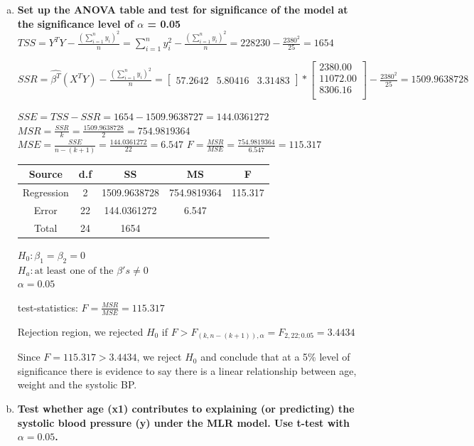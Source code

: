 \documentclass{article}
\begin{document}
\begin{enumerate}[(a)]
\item \textbf{ Set up the ANOVA table and test for significance of the model at the significance level of $\alpha$ = 0.05 } \\
$TSS = Y^TY - \frac{(\sum_{i=1}^{n}{y_i})^2}{n} = \sum_{i=1}^{n}{y_i^2} - \frac{(\sum_{i=1}^{n}{y_i})^2}{n}  = 228230 - \frac{2380^2}{25} = 1654$

$SSR = \hat{\beta^T}(X^TY)  - \frac{(\sum_{i=1}^{n}{y_i})^2}{n}  = \begin{bmatrix}
57.2642 & 5.80416 & 3.31483
\end{bmatrix} * \begin{bmatrix}
2380.00 \\
11072.00 \\
8306.16 \\
\end{bmatrix} - \frac{2380^2}{25} = 1509.9638728$

$SSE = TSS - SSR = 1654 - 1509.9638727 = 144.0361272$
$MSR = \frac{SSR}{k} = \frac{1509.9638728}{2} = 754.9819364$
$MSE = \frac{SSE}{n-(k+1)} = \frac{144.0361272}{22} = 6.547$
$F = \frac{MSR}{MSE} = \frac{754.9819364}{6.547} = 115.317$

\begin{center}
 \begin{tabular}{||c c c c c||} 
 \hline
Source & d.f & SS & MS & F \\ [0.5ex] 
 \hline\hline
Regression & 2 & 1509.9638728 & 754.9819364 & 115.317 \\
 \hline
Error & 22 & 144.0361272 &  6.547 &  \\
 \hline
Total & 24  & 1654 & & \\ [1ex]
 \hline
\end{tabular}
\end{center}

$H_0: \beta_1 = \beta_2 = 0$ \\
$H_a: \text{at least one of the } \beta's \neq 0$ \\
$\alpha = 0.05$

test-statistics: $F = \frac{MSR}{MSE} = 115.317$

Rejection region, we rejected $H_0$ if $F > F_{(k, n-(k+1)), \alpha} = F_{2, 22; 0.05} = 3.4434$

Since $F = 115.317 > 3.4434$, we reject $H_0$ and conclude that at a 5\% level of significance there is evidence to say there is a linear relationship between age, weight and the systolic BP.

\item \textbf{ Test whether age (x1) contributes to explaining (or predicting) the systolic blood pressure (y) under the MLR model. Use t-test with $\alpha = 0.05$. } \\


\end{enumerate}
\end{document}
